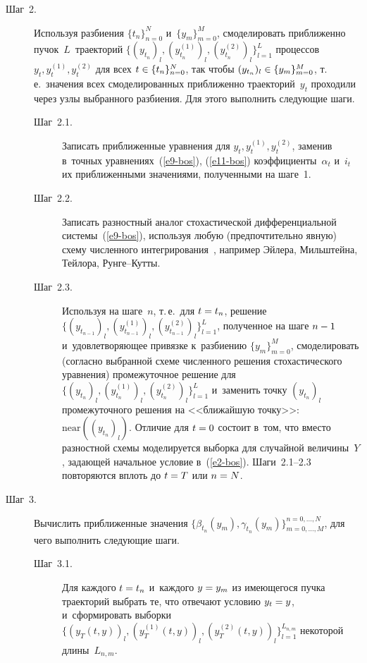 \begin{multicols}{2}
\begin{description}
   \item[Шаг~2.] Используя разбиения $\{t_n\}^N_{n=0}$ 
и~$\{y_m\}^M_{m=0}$, смоделировать приближенно пучок~$L$~траекторий 
$\{ (y_{t_n})_l, (y_{t_n}^{(1)})_l, (y_{t_n}^{(2)})_l\}^L_{l=1}$ процессов 
$y_t, y_t^{(1)}, y_t^{(2)}$ для всех $t\hm\in \{t_n\}^N_{n=0}$, так чтобы 
$(y_{t_n})_{l}\hm\in \{y_m\}^M_{m=0}$, т.\,е.\ значения всех смоделированных 
приближенно траекторий~$y_t$ проходили через узлы выбранного 
разбиения. Для этого выполнить следующие шаги.
     \begin{description}
\item[Шаг~2.1.] Записать приближенные уравнения для $y_t, y_t^{(1)}, 
y_t^{(2)}$, заменив в~точных уравнениях~(\ref{e9-bos}), (\ref{e11-bos}) 
коэффициенты~$\alpha_t$ и~$i_t$ их приближенными значениями, 
полученными на шаге~1.
     \item[Шаг~2.2.] Записать разностный аналог стохастической 
дифференциальной системы~(\ref{e9-bos}), используя любую 
(предпочтительно явную) схему численного интегрирования~\cite{6-bos}, 
например Эйлера, Мильштейна, Тейлора, Рун\-ге--Кут\-ты.
     \item[Шаг~2.3.] Используя на шаге~$n$, т.\,е.\ для $t\hm= t_n$, решение $\{ 
(y_{t_{n-1}})_l, (y^{(1)}_{t_{n-1}})_l, (y^{(2)}_{t_{n-1}})_l\}^L_{l=1}$, 
полученное на шаге $n\hm-1$ и~удовлетворяющее привязке к~разбиению 
$\{y_m\}^M_{m=0}$, смоделировать (согласно выбранной схеме численного 
решения стохастического уравнения) промежуточное решение для $\{ 
(y_{t_{n}})_l, (y^{(1)}_{t_{n}})_l, (y^{(2)}_{t_{n}})_l\}^L_{l=1}$ 
и~заменить точку $(y_{t_{n}})_l$ промежуточного решения на 
<<ближайшую точку>>: $\mathrm{near}((y_{t_{n}})_l)$. Отличие для 
$t\hm=0$ состоит в~том, что вместо разностной схемы моделируется выборка 
для случайной величины~$Y$, задающей начальное условие в~(\ref{e2-bos}). 
Шаги~2.1--2.3 повторяются вплоть до $t\hm=T$ или $n\hm=N$.
 \end{description}    
     
    \item[Шаг~3.] Вычислить приближенные значения 
$\{\beta_{t_n}(y_m),\gamma_{t_n}(y_m)\}^{n=0,\ldots, N}_{m=0,\ldots , M}$, 
для чего выполнить следующие шаги.
   \begin{description}  
\item[Шаг~3.1.] Для каждого $t\hm=t_n$ и~каждого $y\hm=y_m$ из 
имеющегося пучка траекторий выбрать те, что отвечают условию 
$y_t\hm=y$, и~сформировать выборки $\{ ( y_T(t,y))_l, (y_T^{(1)}(t,y))_l, 
(y_T^{(2)}(t,y))_l\}^{L_{n,m}}_{l=1}$ некоторой длины~$L_{n,m}$.
     

\end{description}
\end{description}
\end{multicols}
